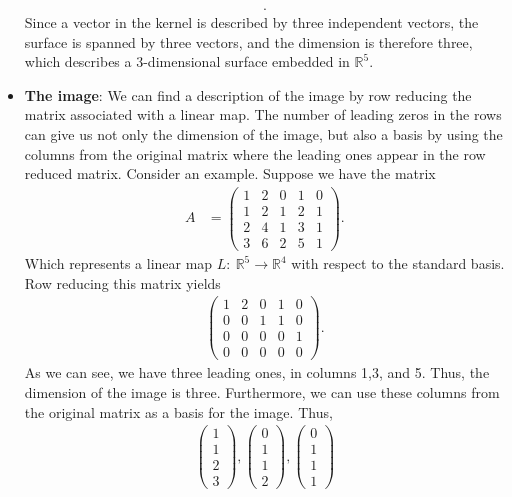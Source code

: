 \documentclass{report}
\begin{document}
\begin{itemize}
\begin{align*}
            .\end{align*}
            \bigbreak \noindent 
            Since a vector in the kernel is described by three independent vectors, the surface is spanned by three vectors, and the dimension is therefore three, which describes a 3-dimensional surface embedded in $\mathbb{R}^{5}$.
        \item \textbf{The image}: We can find a description of the image by row reducing the matrix associated with a linear map. The number of leading zeros in the rows can give us not only the dimension of the image, but also a basis by using the columns from the original matrix where the leading ones appear in the row reduced matrix. Consider an example.
            \bigbreak \noindent 
            Suppose we have the matrix
            \begin{align*}
                A &= \begin{pmatrix} 1 & 2 & 0 & 1 & 0 \\ 1 & 2 & 1 & 2 & 1 \\ 2 & 4 & 1 & 3 & 1 \\ 3 & 6 & 2 & 5 & 1\end{pmatrix}
            .\end{align*}
            Which represents a linear map $L:\ \mathbb{R}^{5} \to \mathbb{R}^{4}$ with respect to the standard basis. Row reducing this matrix yields
            \begin{align*}
                \begin{pmatrix}
                    1 & 2 & 0 & 1 & 0 \\ 0 & 0 & 1 & 1 & 0 \\ 0 & 0 & 0 & 0 & 1 \\ 0 & 0 & 0 & 0 & 0
                \end{pmatrix}
            .\end{align*}
            \bigbreak \noindent 
            As we can see, we have three leading ones, in columns 1,3, and 5. Thus, the dimension of the image is three. Furthermore, we can use these columns from the original matrix as a basis for the image. Thus,
            \begin{align*}
                \begin{pmatrix} 1 \\ 1 \\ 2 \\ 3\end{pmatrix}, \begin{pmatrix} 0 \\ 1 \\ 1 \\ 2 \end{pmatrix}, \begin{pmatrix} 0 \\ 1 \\ 1 \\ 1\end{pmatrix}

\end{align*}
\end{itemize}
\end{document}
